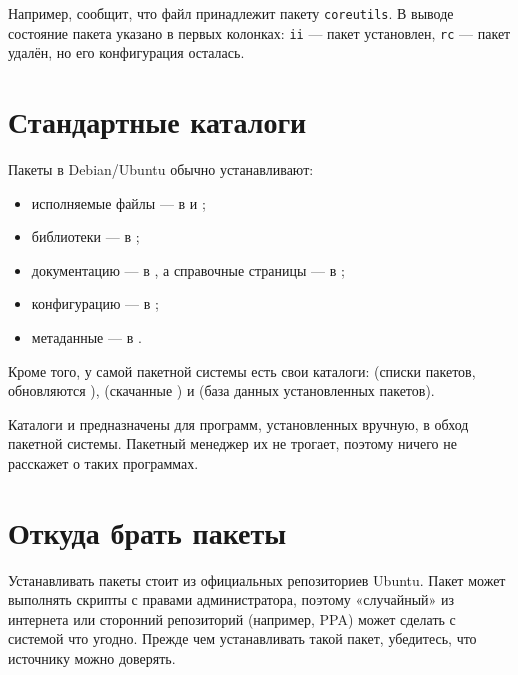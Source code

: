 Например,  сообщит, что файл принадлежит
пакету \texttt{coreutils}. В выводе  состояние пакета
указано в первых колонках: \texttt{ii} --- пакет установлен,
\texttt{rc} --- пакет удалён, но его конфигурация осталась.

\section{Стандартные каталоги}

Пакеты в Debian/Ubuntu обычно устанавливают:
\begin{itemize}
  \item исполняемые файлы --- в  и ;
  \item библиотеки --- в ;
  \item документацию --- в , а справочные
    страницы  --- в ;
  \item конфигурацию --- в ;
  \item метаданные --- в .
\end{itemize}

Кроме того, у самой пакетной системы есть свои каталоги:
 (списки пакетов, обновляются
),  (скачанные )
и  (база данных установленных пакетов).

Каталоги  и  предназначены для программ,
установленных вручную, в обход пакетной системы. Пакетный менеджер
их не трогает, поэтому  ничего не расскажет о таких
программах.

\section{Откуда брать пакеты}

Устанавливать пакеты стоит из официальных репозиториев Ubuntu.
Пакет может выполнять скрипты с правами администратора, поэтому
«случайный»  из интернета или сторонний репозиторий
(например, PPA) может сделать с системой что угодно. Прежде чем
устанавливать такой пакет, убедитесь, что источнику можно доверять.

